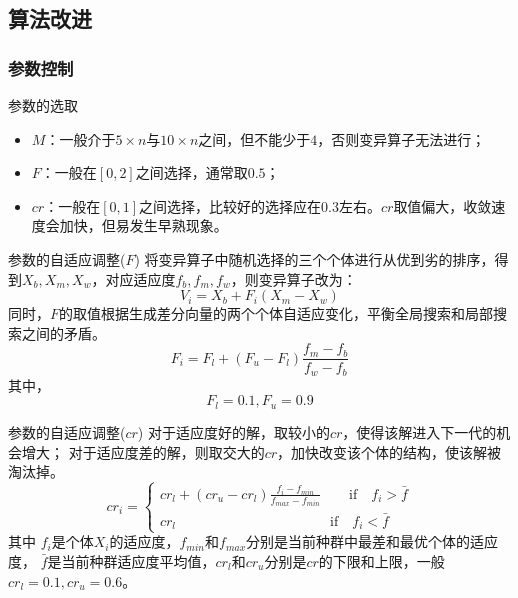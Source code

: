 \subsection{算法改进}
\subsubsection{参数控制}

\begin{frame}{参数的选取}
	\begin{itemize}
		\item $M$：一般介于$5\times n$与$10\times n$之间，但不能少于$4$，否则变异算子无法进行；
		\item $F$：一般在$[0,2]$之间选择，通常取$0.5$；
		\item $cr$：一般在$[0,1]$之间选择，比较好的选择应在$0.3$左右。$cr$取值偏大，收敛速度会加快，但易发生早熟现象。
	\end{itemize}
\end{frame}

\begin{frame}{参数的自适应调整($F$)}
	将变异算子中随机选择的三个个体进行从优到劣的排序，得到$X_b,X_m,X_w$，对应适应度$f_b,f_m,f_w$，则变异算子改为：
	$$V_i=X_b+F_i\left(X_m-X_w\right)$$
	同时，$F$的取值根据生成差分向量的两个个体自适应变化，平衡全局搜索和局部搜索之间的矛盾。
	$$F_i = F_l +\left(F_u-F_l\right)\frac{f_m-f_b}{f_w-f_b}$$
	其中，$$F_l=0.1,F_u=0.9$$
\end{frame}

\begin{frame}{参数的自适应调整($cr$)}
	对于适应度好的解，取较小的$cr$，使得该解进入下一代的机会增大；
	对于适应度差的解，则取交大的$cr$，加快改变该个体的结构，使该解被淘汰掉。
	$$
	cr_i =
	\begin{cases}
		cr_l+\left(cr_u-cr_l\right)\frac{f_i-f_{min}}{f_{max}-f_{min}}  \qquad \mathrm{if} \quad f_i>\bar{f} \\
		cr_l \qquad\qquad \qquad \qquad \qquad \quad \mathrm{if}\quad f_i<\bar{f}
	\end{cases}
	$$
	其中 $f_i$是个体$X_i$的适应度，$f_{min}$和$f_{max}$分别是当前种群中最差和最优个体的适应度，
	$\bar{f}$是当前种群适应度平均值，$cr_l$和$cr_u$分别是$cr$的下限和上限，一般$cr_l=0.1,cr_u=0.6$。
\end{frame}

